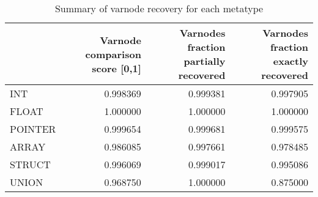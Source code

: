 \begin{table}
\centering
\caption{Summary of varnode recovery for each metatype}
\label{table:metatype-recovery-summary}
\begin{tabular}{lrrr}
\toprule
{} &  Varnode comparison score [0,1] &  Varnodes fraction partially recovered &  Varnodes fraction exactly recovered \\
\midrule
INT     &                        0.998369 &                               0.999381 &                             0.997905 \\
FLOAT   &                        1.000000 &                               1.000000 &                             1.000000 \\
POINTER &                        0.999654 &                               0.999681 &                             0.999575 \\
ARRAY   &                        0.986085 &                               0.997661 &                             0.978485 \\
STRUCT  &                        0.996069 &                               0.999017 &                             0.995086 \\
UNION   &                        0.968750 &                               1.000000 &                             0.875000 \\
\bottomrule
\end{tabular}
\end{table}

